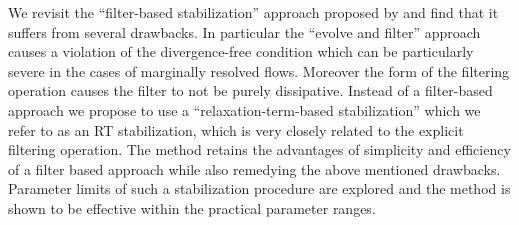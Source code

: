 \begin{paper}

\makepapertitle

%
\begin{paperabstract}
	We revisit the ``filter-based stabilization'' approach proposed by \cite{fischer01} and find that it suffers from several drawbacks. In particular the ``evolve and filter'' approach causes a violation of the divergence-free condition which can be particularly severe in the cases of marginally resolved flows. Moreover the form of the filtering operation causes the filter to not be purely dissipative. Instead of a filter-based approach we propose to use a ``relaxation-term-based stabilization'' which we refer to as an RT stabilization, which is very closely related to the explicit filtering operation. The method retains the advantages of simplicity and efficiency of a filter based approach while also remedying the above mentioned drawbacks. Parameter limits of such a stabilization procedure are explored and the method is shown to be effective within the practical parameter ranges.
\end{paperabstract}


%



%


%

\end{paper}
